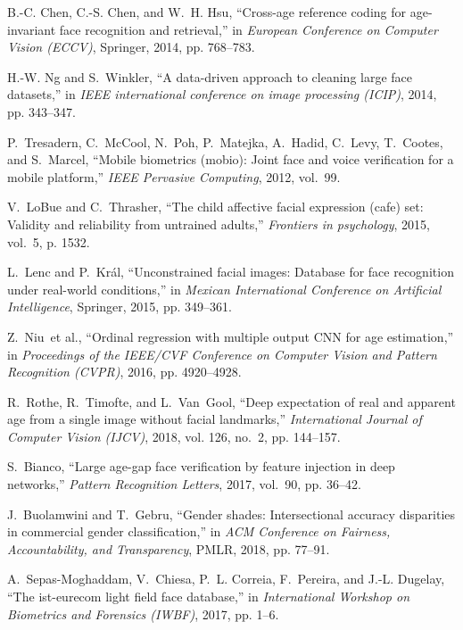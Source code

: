 \documentclass[journal]{IEEEtran}
\begin{document}
\begin{thebibliography}{100}
B.-C. Chen, C.-S. Chen, and W.~H. Hsu, ``Cross-age reference coding for age-invariant face recognition and retrieval,'' in \emph{European Conference on Computer Vision (ECCV)}, Springer, 2014, pp. 768--783.

H.-W. Ng and S.~Winkler, ``A data-driven approach to cleaning large face datasets,'' in \emph{IEEE international conference on image processing
  (ICIP)}, 2014, pp. 343--347.

P.~Tresadern, C.~McCool, N.~Poh, P.~Matejka, A.~Hadid, C.~Levy, T.~Cootes, and S.~Marcel, ``Mobile biometrics (mobio): Joint face and voice verification for
  a mobile platform,'' \emph{IEEE Pervasive Computing}, 2012, vol.~99.

V.~LoBue and C.~Thrasher, ``The child affective facial expression (cafe) set: Validity and reliability from untrained adults,'' \emph{Frontiers in
  psychology}, 2015, vol.~5, p. 1532.

L.~Lenc and P.~Kr{\'a}l, ``Unconstrained facial images: Database for face recognition under real-world conditions,'' in \emph{Mexican International
  Conference on Artificial Intelligence}, Springer, 2015, pp. 349--361.

Z.~Niu~et al., ``Ordinal regression with multiple output {CNN} for age estimation,'' in \emph{Proceedings of the IEEE/CVF Conference on Computer Vision and Pattern Recognition (CVPR)}, 2016, pp. 4920--4928.

R.~Rothe, R.~Timofte, and L.~Van~Gool, ``Deep expectation of real and apparent age from a single image without facial landmarks,'' \emph{International Journal of Computer Vision (IJCV)}, 2018, vol. 126, no.~2, pp. 144--157.

S.~Bianco, ``Large age-gap face verification by feature injection in deep networks,'' \emph{Pattern Recognition Letters}, 2017, vol.~90, pp. 36--42.

J.~Buolamwini and T.~Gebru, ``Gender shades: Intersectional accuracy disparities in commercial gender classification,'' in \emph{ACM Conference on Fairness, Accountability, and Transparency}, PMLR, 2018, pp. 77--91.

A.~Sepas-Moghaddam, V.~Chiesa, P.~L. Correia, F.~Pereira, and J.-L. Dugelay,
  ``The ist-eurecom light field face database,'' in \emph{International Workshop on Biometrics and Forensics (IWBF)}, 2017, pp. 1--6.


\end{thebibliography}
\end{document}
